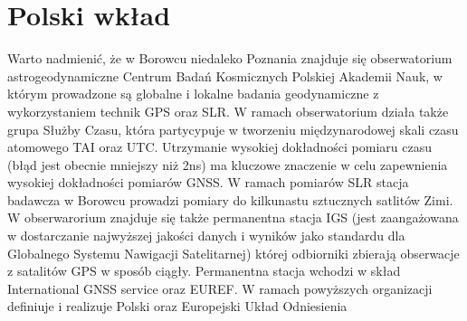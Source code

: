 \section{Polski wkład}
\noindent Warto nadmienić, że w Borowcu niedaleko Poznania znajduje się obserwatorium astrogeodynamiczne Centrum Badań Kosmicznych Polskiej Akademii Nauk, 
w którym prowadzone są globalne i lokalne badania geodynamiczne z wykorzystaniem technik GPS oraz SLR.
W ramach obserwatorium działa także grupa Służby Czasu, która partycypuje w tworzeniu międzynarodowej skali czasu atomowego TAI oraz UTC.
Utrzymanie wysokiej dokładności pomiaru czasu (błąd jest obecnie mniejszy niż 2ns) ma kluczowe znaczenie w celu zapewnienia 
wysokiej dokładności pomiarów GNSS. \cite[][zakładka: infomracje ogólne]{BOROWIEC}
\indent W ramach pomiarów SLR stacja badawcza w Borowcu prowadzi pomiary do kilkunastu sztucznych satlitów Zimi. 
W obserwarorium znajduje się także permanentna stacja IGS (jest zaangażowana w dostarczanie najwyższej jakości danych i wyników jako standardu dla Globalnego Systemu Nawigacji Satelitarnej) której odbiorniki zbierają obserwacje z satalitów GPS w sposób ciągły.
Permanentna stacja wchodzi w skład International GNSS service oraz EUREF. W ramach powyższych organizacji definiuje i realizuje Polski oraz Europejski Układ Odniesienia
\cite[][zakładka: Stacja IGS]{BOROWIEC}
 
